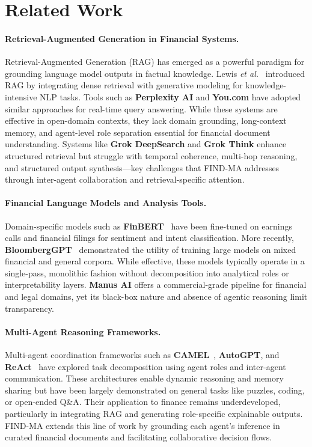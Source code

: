 \documentclass[11pt]{article}
\newcommand{\findma}{\textsc{FIND-MA}}
\newcommand{\etal}{\textit{et al.}}
\begin{document}
\section{Related Work}
\label{sec:related}

\paragraph{Retrieval-Augmented Generation in Financial Systems.}
Retrieval-Augmented Generation (RAG) has emerged as a powerful paradigm for grounding language model outputs in factual knowledge. Lewis \etal~\cite{lewis2020retrieval} introduced RAG by integrating dense retrieval with generative modeling for knowledge-intensive NLP tasks. Tools such as \textbf{Perplexity AI} and \textbf{You.com} have adopted similar approaches for real-time query answering. While these systems are effective in open-domain contexts, they lack domain grounding, long-context memory, and agent-level role separation essential for financial document understanding. Systems like \textbf{Grok DeepSearch} and \textbf{Grok Think} enhance structured retrieval but struggle with temporal coherence, multi-hop reasoning, and structured output synthesis—key challenges that \findma{} addresses through inter-agent collaboration and retrieval-specific attention.

\paragraph{Financial Language Models and Analysis Tools.}
Domain-specific models such as \textbf{FinBERT}~\cite{araci2019finbert} have been fine-tuned on earnings calls and financial filings for sentiment and intent classification. More recently, \textbf{BloombergGPT}~\cite{wu2023bloomberggpt} demonstrated the utility of training large models on mixed financial and general corpora. While effective, these models typically operate in a single-pass, monolithic fashion without decomposition into analytical roles or interpretability layers. \textbf{Manus AI} offers a commercial-grade pipeline for financial and legal domains, yet its black-box nature and absence of agentic reasoning limit transparency.

\paragraph{Multi-Agent Reasoning Frameworks.}
Multi-agent coordination frameworks such as \textbf{CAMEL}~\cite{li2023camel}, \textbf{AutoGPT}, and \textbf{ReAct}~\cite{yao2023react} have explored task decomposition using agent roles and inter-agent communication. These architectures enable dynamic reasoning and memory sharing but have been largely demonstrated on general tasks like puzzles, coding, or open-ended Q\&A. Their application to finance remains underdeveloped, particularly in integrating RAG and generating role-specific explainable outputs. \findma{} extends this line of work by grounding each agent’s inference in curated financial documents and facilitating collaborative decision flows.
\end{document}
